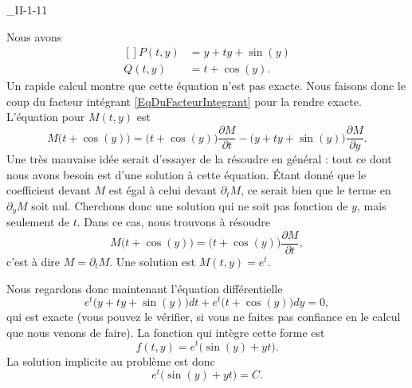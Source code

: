 \begin{corrige}{_II-1-11}
\begin{enumerate}
Nous avons
\begin{equation}
	\begin{aligned}[]
		P(t,y)	&=y+ty+\sin(y)\\
		Q(t,y)	&=t+\cos(y).
	\end{aligned}
\end{equation}
Un rapide calcul montre que cette équation n'est pas exacte. Nous faisons donc le coup du facteur intégrant \eqref{EqDuFacteurIntegrant} pour la rendre exacte. L'équation pour $M(t,y)$ est
\begin{equation}
	M\big( t+\cos(y) \big)=\big( t+\cos(y) \big)\frac{ \partial M }{ \partial t }-\big(y+ty+\sin(y)\big)\frac{ \partial M }{ \partial y }.
\end{equation}
Une très mauvaise idée serait d'essayer de la résoudre en général : tout ce dont nous avons besoin est d'une solution à cette équation. Étant donné que le coefficient devant $M$ est égal à celui devant $\partial_tM$, ce serait bien que le terme en $\partial_yM$ soit nul. Cherchons donc une solution qui ne soit pas fonction de $y$, mais seulement de $t$. Dans ce cas, nous trouvons à résoudre
\begin{equation}
	M\big( t+\cos(y) \big)=\big( t+\cos(y) \big)\frac{ \partial M }{ \partial t },
\end{equation}
c'est à dire $M=\partial_tM$. Une solution est $M(t,y)= e^{t}$.

Nous regardons donc maintenant l'équation différentielle
\begin{equation}
	e^t\big(y+ty+\sin(y)\big)dt+e^t\big(t+\cos(y)\big)dy=0,
\end{equation}
qui est exacte (vous pouvez le vérifier, si vous ne faites pas confiance en le calcul que nous venons de faire). La fonction qui intègre cette forme est
\begin{equation}
	f(t,y)=e^t\big( \sin(y)+yt \big).
\end{equation}
La solution implicite au problème est donc
\begin{equation}
	e^t\big( \sin(y)+yt \big)=C.
\end{equation}



\end{enumerate}


\end{corrige}
